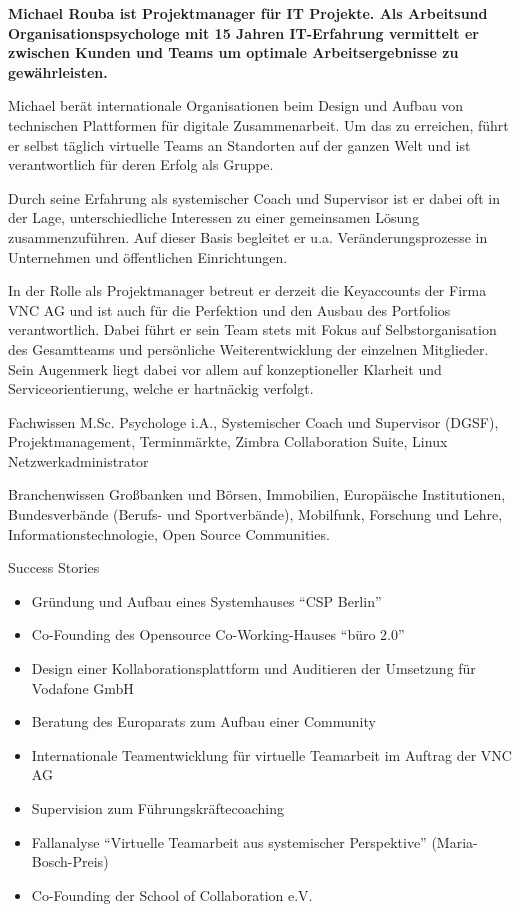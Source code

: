 \begin{para}{}
\bf Michael Rouba ist Projektmanager für IT Projekte. Als Arbeitsund Organisationspsychologe mit 15 Jahren IT-Erfahrung vermittelt er zwischen Kunden und Teams um optimale Arbeitsergebnisse zu gewährleisten.
\end{para}
\begin{para}{}
Michael berät internationale Organisationen beim Design und Aufbau von technischen Plattformen für digitale Zusammenarbeit. Um das zu erreichen, führt er selbst täglich virtuelle Teams an Standorten auf der ganzen Welt und ist verantwortlich für deren Erfolg als Gruppe.
\end{para}
\begin{para}{}
Durch seine Erfahrung als systemischer Coach und Supervisor ist er dabei oft in der Lage, unterschiedliche Interessen zu einer gemeinsamen Lösung zusammenzuführen. Auf dieser Basis begleitet er u.a. Veränderungsprozesse in Unternehmen und öffentlichen Einrichtungen.
\end{para}
\begin{para}{}
In der Rolle als Projektmanager betreut er derzeit die Keyaccounts der Firma VNC AG und ist auch für die Perfektion und den Ausbau des Portfolios verantwortlich. Dabei führt er sein Team stets mit Fokus auf Selbstorganisation des Gesamtteams und persönliche Weiterentwicklung der einzelnen Mitglieder. Sein Augenmerk liegt dabei vor allem auf konzeptioneller Klarheit und Serviceorientierung, welche er hartnäckig verfolgt.
\end{para}
\begin{para}{Fachwissen}
M.Sc. Psychologe i.A., Systemischer Coach und Supervisor (DGSF), Projektmanagement, Terminmärkte, Zimbra Collaboration Suite, Linux Netzwerkadministrator
\end{para}
\begin{para}{Branchenwissen}
Großbanken und Börsen, Immobilien, Europäische Institutionen, Bundesverbände (Berufs- und Sportverbände), Mobilfunk, Forschung und Lehre, Informationstechnologie, Open Source Communities.
\end{para}
\begin{para}{Success Stories}
\begin{itemize}
\item Gründung und Aufbau eines Systemhauses ``CSP Berlin''
\item Co-Founding des Opensource Co-Working-Hauses ``büro 2.0''
\item Design einer Kollaborationsplattform und Auditieren der Umsetzung für Vodafone GmbH
\item Beratung des Europarats zum Aufbau einer Community
\item Internationale Teamentwicklung für virtuelle Teamarbeit im Auftrag der VNC AG
\item Supervision zum Führungskräftecoaching
\item Fallanalyse ``Virtuelle Teamarbeit aus systemischer Perspektive'' (Maria-Bosch-Preis)
\item Co-Founding der School of Collaboration e.V.
\end{itemize}
\end{para}

